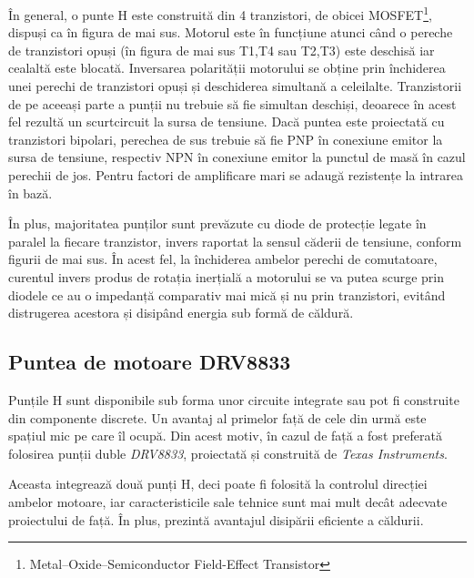 
În general, o punte H este construită din 4 tranzistori, de obicei MOSFET\footnote{Metal–Oxide–Semiconductor Field-Effect Transistor}, dispuși ca în figura de mai sus. Motorul este în funcțiune atunci când o pereche de tranzistori opuși (în figura de mai sus T1,T4 sau T2,T3) este deschisă iar cealaltă este blocată. Inversarea polarității motorului se obține prin închiderea unei perechi de tranzistori opuși și deschiderea simultană a celeilalte. Tranzistorii de pe aceeași parte a punții nu trebuie să fie simultan deschiși, deoarece în acest fel rezultă un scurtcircuit la sursa de tensiune. Dacă puntea este proiectată cu tranzistori bipolari, perechea de sus trebuie să fie PNP în conexiune emitor la sursa de tensiune, respectiv NPN în conexiune emitor la punctul de masă în cazul perechii de jos. Pentru factori de amplificare mari se adaugă rezistențe la intrarea în bază.

În plus, majoritatea punților sunt prevăzute cu diode de protecție legate în paralel la fiecare tranzistor, invers raportat la sensul căderii de tensiune, conform figurii de mai sus. În acest fel, la închiderea ambelor perechi de comutatoare, curentul invers produs de rotația inerțială a motorului se va putea scurge prin diodele ce au o impedanță comparativ mai mică și nu prin tranzistori, evitând distrugerea acestora și disipând energia sub formă de căldură.

\subsection{Puntea de motoare DRV8833}

Punțile H sunt disponibile sub forma unor circuite integrate sau pot fi construite din componente discrete. Un avantaj al primelor față de cele din urmă este spațiul mic pe care îl ocupă. Din acest motiv, în cazul de față a fost preferată folosirea punții duble \textit{DRV8833}, proiectată și construită de \textit{Texas Instruments}.


Aceasta integrează două punți H, deci poate fi folosită la controlul direcției ambelor motoare, iar caracteristicile sale tehnice sunt mai mult decât adecvate proiectului de față. În plus, prezintă avantajul disipării eficiente a căldurii.


